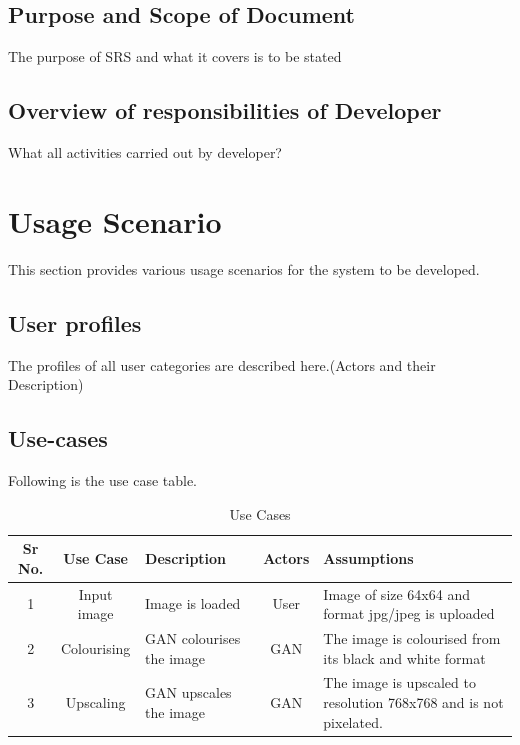 \documentclass[oneside,a4paper,12pt]{report}
\begin{document}
\subsection{Purpose and Scope of Document}
The purpose of SRS and what it covers is to be stated

\subsection{Overview of responsibilities of Developer}
What all activities carried out by developer?

\section{Usage Scenario}
This section provides various usage scenarios for the system to be developed.
 \subsection{User profiles}
The profiles of all user categories are described here.(Actors and their Description)

\subsection{Use-cases}
Following is the use case table.

\begin{table}[!htbp]
\begin{center}
\def\arraystretch{1.5}
\begin{tabularx}{\textwidth}{| c | c | X | c | X |}
\hline
Sr No.	& Use Case	& Description	& Actors	& Assumptions \\
\hline
1& Input image & Image is loaded & User & Image of size 64x64 and format jpg/jpeg is uploaded  \\ \hline
2& Colourising & GAN colourises the image & GAN & The image is colourised from its black and white format \\ \hline
3& Upscaling & GAN upscales the image & GAN & The image is upscaled to resolution 768x768 and is not pixelated. \\ \hline
\end{tabularx}
\end{center}
\caption{Use Cases}
\label{tab:usecase}
\end{table}
\end{document}
